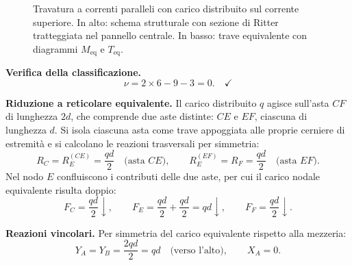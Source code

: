 \begin{esempio}
\begin{svolgimento}
\begin{figure}[htbp]
\begin{tikzpicture}[
				>=stealth,
				line cap=round,
				line join=round,
				]
				
				
			\end{tikzpicture}
			\caption{Travatura a correnti paralleli con carico
				distribuito sul corrente superiore. In alto:
				schema strutturale con sezione di Ritter
				tratteggiata nel pannello centrale. In basso:
				trave equivalente con diagrammi $M_\text{eq}$
				e $T_\text{eq}$.}
			\label{fig:travatura_correnti}
		\end{figure}
		
		
		\noindent\textbf{Verifica della classificazione.}
		\[
		\nu = 2 \times 6 - 9 - 3 = 0. \quad\checkmark
		\]
		
		\noindent\textbf{Riduzione a reticolare equivalente.}
		Il carico distribuito $q$ agisce sull'asta $CF$ di
		lunghezza $2d$, che comprende due aste distinte:
		$CE$ e $EF$, ciascuna di lunghezza $d$.
		Si isola ciascuna asta come trave appoggiata alle
		proprie cerniere di estremità e si calcolano le
		reazioni trasversali per simmetria:
		\[
		R_C = R_E^{(CE)} = \frac{qd}{2}
		\quad \text{(asta } CE\text{)},
		\qquad
		R_E^{(EF)} = R_F = \frac{qd}{2}
		\quad \text{(asta } EF\text{)}.
		\]
		Nel nodo $E$ confluiscono i contributi delle due aste,
		per cui il carico nodale equivalente risulta doppio:
		\[
		F_C = \frac{qd}{2} \downarrow, \qquad
		F_E = \frac{qd}{2} + \frac{qd}{2} = qd \downarrow, \qquad
		F_F = \frac{qd}{2} \downarrow.
		\]
		
		\noindent\textbf{Reazioni vincolari.}
		Per simmetria del carico equivalente rispetto alla
		mezzeria:
		\[
		Y_A = Y_B = \frac{2qd}{2} = qd
		\quad\text{(verso l'alto)}, \qquad X_A = 0.
		\]
		

\end{svolgimento}
\end{esempio}
